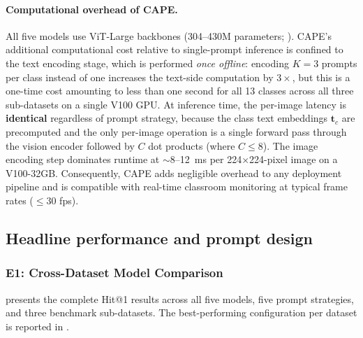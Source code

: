 \documentclass[electronics,article,submit,pdftex,moreauthors]{Definitions/mdpi}
\begin{document}
\paragraph{Computational overhead of CAPE.}
All five models use ViT-Large backbones (304--430M parameters; ). CAPE's additional computational cost relative to single-prompt inference is confined to the text encoding stage, which is performed \emph{once offline}: encoding $K\!=\!3$ prompts per class instead of one increases the text-side computation by $3\times$, but this is a one-time cost amounting to less than one second for all 13 classes across all three sub-datasets on a single V100 GPU. At inference time, the per-image latency is \textbf{identical} regardless of prompt strategy, because the class text embeddings $\mathbf{t}_c$ are precomputed and the only per-image operation is a single forward pass through the vision encoder followed by $C$ dot products (where $C \leq 8$). The image encoding step dominates runtime at $\sim$8--12~ms per 224$\times$224-pixel image on a V100-32GB. Consequently, CAPE adds negligible overhead to any deployment pipeline and is compatible with real-time classroom monitoring at typical frame rates ($\leq$30 fps).

\subsection{Headline performance and prompt design}

\subsubsection{E1: Cross-Dataset Model Comparison}
\label{sec:e1}

 presents the complete Hit@1 results across all five models, five prompt strategies, and three benchmark sub-datasets.
The best-performing configuration per dataset is reported in .
\end{document}
